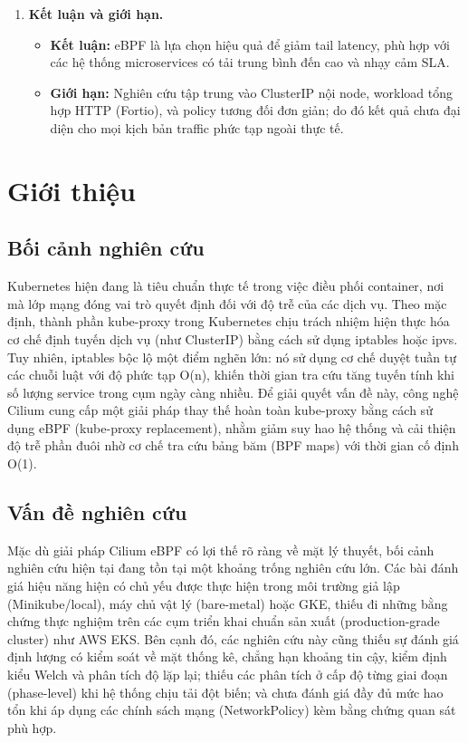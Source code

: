 \begin{enumerate}
\item \textbf{Kết luận và giới hạn.}
\begin{itemize}
	\item \textbf{Kết luận:} eBPF là lựa chọn hiệu quả để giảm tail latency, phù hợp với các hệ thống microservices có tải trung bình đến cao và nhạy cảm SLA.
	\item \textbf{Giới hạn:} Nghiên cứu tập trung vào ClusterIP nội node, workload tổng hợp HTTP (Fortio), và policy tương đối đơn giản; do đó kết quả chưa đại diện cho mọi kịch bản traffic phức tạp ngoài thực tế.
\end{itemize}
\end{enumerate}

\clearpage

\chapter{Giới thiệu}
\section{Bối cảnh nghiên cứu} %
 Kubernetes hiện đang là tiêu chuẩn thực tế trong việc điều phối container, nơi mà lớp mạng đóng vai trò quyết định đối với độ trễ của các dịch vụ. 
 Theo mặc định, thành phần kube-proxy trong Kubernetes chịu trách nhiệm hiện thực hóa cơ chế định tuyến dịch vụ (như ClusterIP) bằng cách sử dụng iptables 
 hoặc ipvs. Tuy nhiên, iptables bộc lộ một điểm nghẽn lớn: nó sử dụng cơ chế duyệt tuần tự các chuỗi luật với độ phức tạp O(n), khiến thời gian tra cứu 
 tăng tuyến tính khi số lượng service trong cụm ngày càng nhiều. Để giải quyết vấn đề này, công nghệ Cilium cung cấp một giải pháp thay thế hoàn toàn 
 kube-proxy bằng cách sử dụng eBPF (kube-proxy replacement), nhằm giảm suy hao hệ thống và cải thiện độ trễ phần đuôi nhờ cơ chế tra cứu bảng băm (BPF maps) 
 với thời gian cố định O(1).
\section{Vấn đề nghiên cứu} %
Mặc dù giải pháp Cilium eBPF có lợi thế rõ ràng về mặt lý thuyết, bối cảnh nghiên cứu hiện tại đang tồn tại một khoảng trống nghiên cứu lớn. 
Các bài đánh giá hiệu năng hiện có chủ yếu được thực hiện trong môi trường giả lập (Minikube/local), máy chủ vật lý (bare-metal) hoặc GKE, thiếu đi những bằng chứng thực nghiệm trên các cụm triển khai chuẩn sản xuất (production-grade cluster) như AWS EKS. 
Bên cạnh đó, các nghiên cứu này cũng thiếu sự đánh giá định lượng có kiểm soát về mặt thống kê, chẳng hạn khoảng tin cậy, kiểm định kiểu Welch và phân tích độ lặp lại; thiếu các phân tích ở cấp độ 
từng giai đoạn (phase-level) khi hệ thống chịu tải đột biến; và chưa đánh giá đầy đủ mức hao tổn khi áp dụng các chính sách mạng (NetworkPolicy) kèm bằng chứng quan sát phù hợp.

